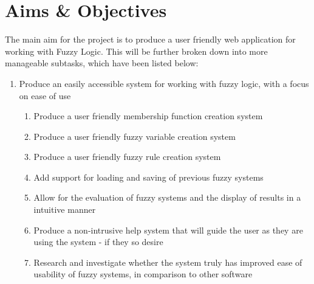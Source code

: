 \documentclass[a4paper,twoside,notitlepage,11pt]{article}
\begin{document}
\section{Aims \& Objectives}
The main aim for the project is to produce a user friendly web application for working with Fuzzy Logic. This will be further broken down into more manageable subtasks, which have been listed below:
\begin{enumerate}
\item Produce an easily accessible system for working with fuzzy logic, with a focus on ease of use
\begin{enumerate}
\item Produce a user friendly membership function creation system
\item Produce a user friendly fuzzy variable creation system
\item Produce a user friendly fuzzy rule creation system
\item Add support for loading and saving of previous fuzzy systems
\item Allow for the evaluation of fuzzy systems and the display of results in a intuitive manner
\item Produce a non-intrusive help system that will guide the user as they are using the system - if they so desire
\item Research and investigate whether the system truly has improved ease of usability of fuzzy systems, in comparison to other software
\end{enumerate}
\end{enumerate}

\newpage
\pagestyle{plain}
\end{document}
